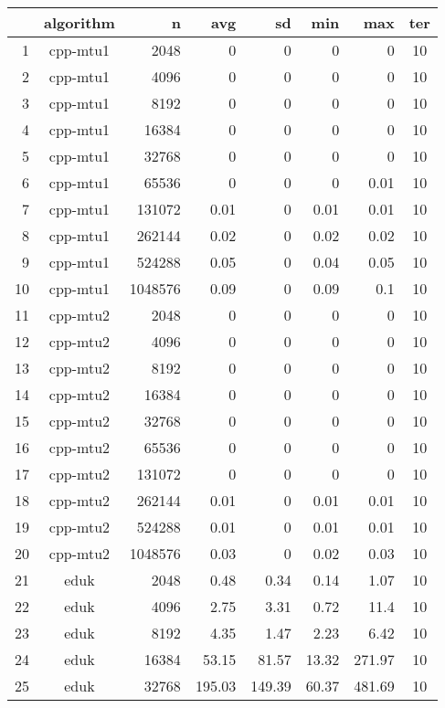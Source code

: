 \begin{longtable}{rcrrrrrc}
  \hline
 & algorithm & n & avg & sd & min & max & ter \\ 
  \hline \endhead  \hline
1 & cpp-mtu1 & 2048 & 0 & 0 & 0 & 0 &  10 \\ 
  2 & cpp-mtu1 & 4096 & 0 & 0 & 0 & 0 &  10 \\ 
  3 & cpp-mtu1 & 8192 & 0 & 0 & 0 & 0 &  10 \\ 
  4 & cpp-mtu1 & 16384 & 0 & 0 & 0 & 0 &  10 \\ 
  5 & cpp-mtu1 & 32768 & 0 & 0 & 0 & 0 &  10 \\ 
  6 & cpp-mtu1 & 65536 & 0 & 0 & 0 & 0.01 &  10 \\ 
  7 & cpp-mtu1 & 131072 & 0.01 & 0 & 0.01 & 0.01 &  10 \\ 
  8 & cpp-mtu1 & 262144 & 0.02 & 0 & 0.02 & 0.02 &  10 \\ 
  9 & cpp-mtu1 & 524288 & 0.05 & 0 & 0.04 & 0.05 &  10 \\ 
  10 & cpp-mtu1 & 1048576 & 0.09 & 0 & 0.09 & 0.1 &  10 \\ 
  11 & cpp-mtu2 & 2048 & 0 & 0 & 0 & 0 &  10 \\ 
  12 & cpp-mtu2 & 4096 & 0 & 0 & 0 & 0 &  10 \\ 
  13 & cpp-mtu2 & 8192 & 0 & 0 & 0 & 0 &  10 \\ 
  14 & cpp-mtu2 & 16384 & 0 & 0 & 0 & 0 &  10 \\ 
  15 & cpp-mtu2 & 32768 & 0 & 0 & 0 & 0 &  10 \\ 
  16 & cpp-mtu2 & 65536 & 0 & 0 & 0 & 0 &  10 \\ 
  17 & cpp-mtu2 & 131072 & 0 & 0 & 0 & 0 &  10 \\ 
  18 & cpp-mtu2 & 262144 & 0.01 & 0 & 0.01 & 0.01 &  10 \\ 
  19 & cpp-mtu2 & 524288 & 0.01 & 0 & 0.01 & 0.01 &  10 \\ 
  20 & cpp-mtu2 & 1048576 & 0.03 & 0 & 0.02 & 0.03 &  10 \\ 
  21 & eduk & 2048 & 0.48 & 0.34 & 0.14 & 1.07 &  10 \\ 
  22 & eduk & 4096 & 2.75 & 3.31 & 0.72 & 11.4 &  10 \\ 
  23 & eduk & 8192 & 4.35 & 1.47 & 2.23 & 6.42 &  10 \\ 
  24 & eduk & 16384 & 53.15 & 81.57 & 13.32 & 271.97 &  10 \\ 
  25 & eduk & 32768 & 195.03 & 149.39 & 60.37 & 481.69 &  10 \\ 

\end{longtable}
